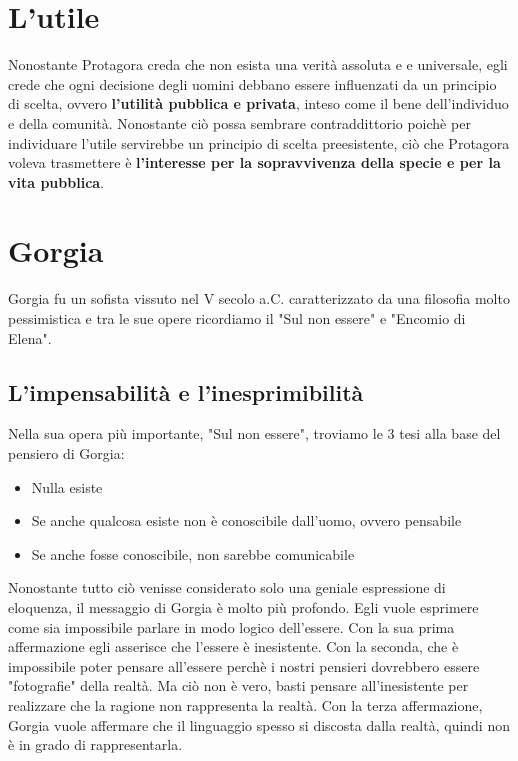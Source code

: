 \documentclass[10pt,a4paper]{article}
\begin{document}
	\section{L'utile}
	
	Nonostante Protagora creda che non esista una verità assoluta e e universale, egli crede che ogni decisione degli uomini debbano essere influenzati da un principio di scelta, ovvero \textbf{l'utilità pubblica e privata}, inteso come il bene dell'individuo e della comunità. Nonostante ciò possa sembrare contraddittorio poichè per individuare l'utile servirebbe un principio di scelta preesistente, ciò che Protagora voleva trasmettere è \textbf{l'interesse per la sopravvivenza della specie e per la vita pubblica}.
	
	\section{Gorgia}
	
	Gorgia fu un sofista vissuto nel V secolo a.C. caratterizzato da una filosofia molto pessimistica e tra le sue opere ricordiamo il "Sul non essere" e "Encomio di Elena".
	
	\subsection{L'impensabilità e l'inesprimibilità}
	
	Nella sua opera più importante, "Sul non essere", troviamo le 3 tesi alla base del pensiero di Gorgia:
	\begin{itemize}
		\item Nulla esiste
		\item Se anche qualcosa esiste non è conoscibile dall'uomo, ovvero pensabile
		\item Se anche fosse conoscibile, non sarebbe comunicabile
	\end{itemize}
	Nonostante tutto ciò venisse considerato solo una geniale espressione di eloquenza, il messaggio di Gorgia è molto più profondo. Egli vuole esprimere come sia impossibile parlare in modo logico dell'essere. Con la sua prima affermazione egli asserisce che l'essere è inesistente. Con la seconda, che è impossibile poter pensare all'essere perchè i nostri pensieri dovrebbero essere "fotografie" della realtà. Ma ciò non è vero, basti pensare all'inesistente per realizzare che la ragione non rappresenta la realtà. Con la terza affermazione, Gorgia vuole affermare che il linguaggio spesso si discosta dalla realtà, quindi non è in grado di rappresentarla. 
	
\end{document}
